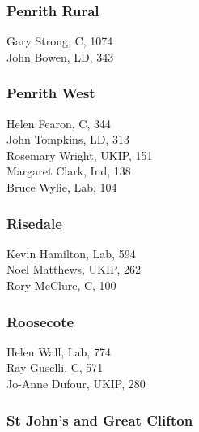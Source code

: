\documentclass[a4paper,openany,10pt]{book}
\begin{document}
\subsubsection*{Penrith Rural}



Gary Strong, C, 1074\\
John Bowen, LD, 343\\


\subsubsection*{Penrith West}



Helen Fearon, C, 344\\
John Tompkins, LD, 313\\
Rosemary Wright, UKIP, 151\\
Margaret Clark, Ind, 138\\
Bruce Wylie, Lab, 104\\


\subsubsection*{Risedale}



Kevin Hamilton, Lab, 594\\
Noel Matthews, UKIP, 262\\
Rory McClure, C, 100\\


\subsubsection*{Roosecote}



Helen Wall, Lab, 774\\
Ray Guselli, C, 571\\
Jo-Anne Dufour, UKIP, 280\\


\subsubsection*{St John's and Great Clifton}

\end{document}
